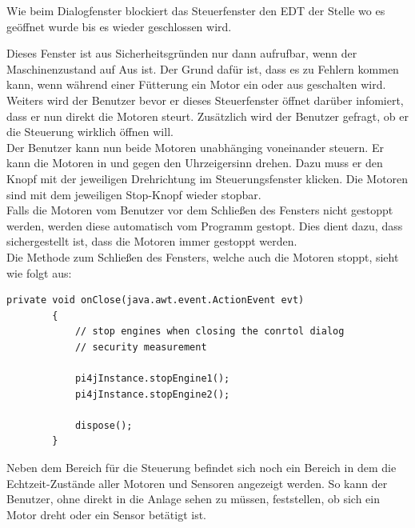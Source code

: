 \vspace{10pt}

Wie beim Dialogfenster blockiert das Steuerfenster den EDT der Stelle wo es geöffnet wurde bis es wieder geschlossen wird.

\vspace{10pt}

Dieses Fenster ist aus Sicherheitsgründen nur dann aufrufbar, wenn der Maschinenzustand auf Aus ist. Der Grund dafür ist, dass es zu Fehlern kommen kann, wenn während einer Fütterung ein Motor ein oder aus geschalten wird.
\\ Weiters wird der Benutzer bevor er dieses Steuerfenster öffnet darüber infomiert, dass er nun direkt die Motoren steurt. Zusätzlich wird der Benutzer gefragt, ob er die Steuerung wirklich öffnen will.
\\ Der Benutzer kann nun beide Motoren unabhänging voneinander steuern. Er kann die Motoren in und gegen den Uhrzeigersinn drehen. Dazu muss er den Knopf mit der jeweiligen Drehrichtung im Steuerungsfenster klicken. Die Motoren sind mit dem jeweiligen Stop-Knopf wieder stopbar.
\\ Falls die Motoren vom Benutzer vor dem Schließen des Fensters nicht gestoppt werden, werden diese automatisch vom Programm gestopt. Dies dient dazu, dass sichergestellt ist, dass die Motoren immer gestoppt werden.
\\ Die Methode zum Schließen des Fensters, welche auch die Motoren stoppt, sieht wie folgt aus:
\begin{lstlisting}[style=JavaStyle, caption=Motoren stoppen und Fenster schließen]
	private void onClose(java.awt.event.ActionEvent evt)                                
    	{                                 
       		// stop engines when closing the conrtol dialog
       		// security measurement
       		
        	pi4jInstance.stopEngine1();
        	pi4jInstance.stopEngine2();
        
        	dispose();
    	} 
\end{lstlisting}

\vspace{10pt}

Neben dem Bereich für die Steuerung befindet sich noch ein Bereich in dem die Echtzeit-Zustände aller Motoren und Sensoren angezeigt werden. So kann der Benutzer, ohne direkt in die Anlage sehen zu müssen, feststellen, ob sich ein Motor dreht oder ein Sensor betätigt ist.

\vspace{10pt}

